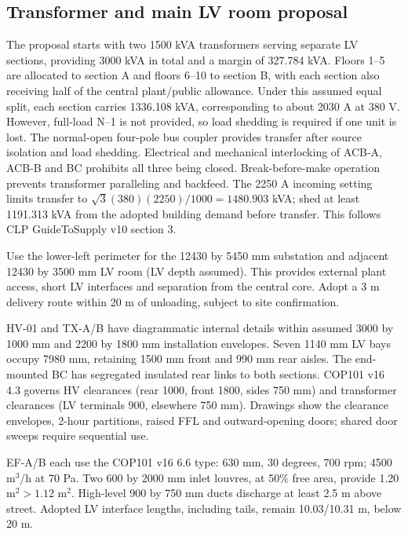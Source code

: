 \subsection*{Transformer and main LV room proposal}
The proposal starts with two 1500 kVA transformers serving separate LV sections, providing 3000 kVA in total and a margin of 327.784 kVA. Floors 1--5 are allocated to section A and floors 6--10 to section B, with each section also receiving half of the central plant/public allowance. Under this assumed equal split, each section carries 1336.108 kVA, corresponding to about 2030 A at 380 V. However, full-load N--1 is not provided, so load shedding is required if one unit is lost. The normal-open four-pole bus coupler provides transfer after source isolation and load shedding. Electrical and mechanical interlocking of ACB-A, ACB-B and BC prohibits all three being closed. Break-before-make operation prevents transformer paralleling and backfeed. The 2250 A incoming setting limits transfer to $\sqrt3(380)(2250)/1000=1480.903$ kVA; shed at least 1191.313 kVA from the adopted building demand before transfer. This follows CLP GuideToSupply v10 section 3.

Use the lower-left perimeter for the 12430 by 5450 mm substation and adjacent 12430 by 3500 mm LV room (LV depth assumed). This provides external plant access, short LV interfaces and separation from the central core. Adopt a 3 m delivery route within 20 m of unloading, subject to site confirmation.

HV-01 and TX-A/B have diagrammatic internal details within assumed 3000 by 1000 mm and 2200 by 1800 mm installation envelopes. Seven 1140 mm LV bays occupy 7980 mm, retaining 1500 mm front and 990 mm rear aisles. The end-mounted BC has segregated insulated rear links to both sections. COP101 v16 4.3 governs HV clearances (rear 1000, front 1800, sides 750 mm) and transformer clearances (LV terminals 900, elsewhere 750 mm). Drawings show the clearance envelopes, 2-hour partitions, raised FFL and outward-opening doors; shared door sweeps require sequential use.

EF-A/B each use the COP101 v16 6.6 type: 630 mm, 30 degrees, 700 rpm; 4500 m$^3$/h at 70 Pa. Two 600 by 2000 mm inlet louvres, at 50\% free area, provide 1.20 m$^2>1.12$ m$^2$. High-level 900 by 750 mm ducts discharge at least 2.5 m above street. Adopted LV interface lengths, including tails, remain 10.03/10.31 m, below 20 m.


